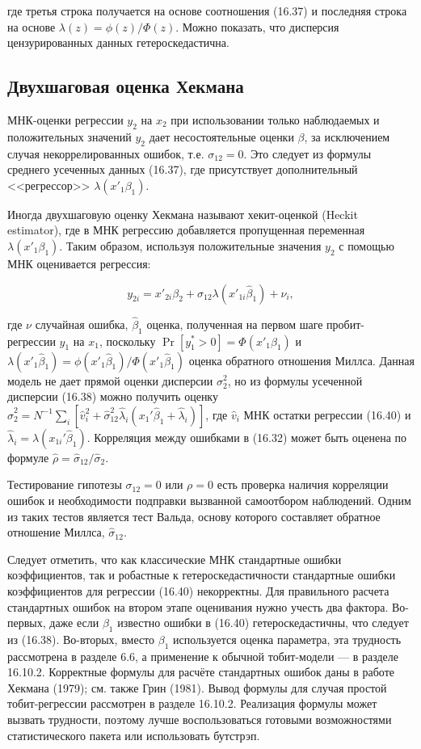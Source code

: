 где третья строка получается на основе соотношения (16.37) и последняя строка на основе $\lambda(z)=\phi(z)/{\Phi}(z)$. Можно показать, что дисперсия цензурированных данных гетероскедастична.


\subsection{Двухшаговая оценка Хекмана}

МНК-оценки регрессии $y_2$ на $x_2$ при использовании только наблюдаемых и положительных значений $y_2$ дает несостоятельные оценки $\beta$, за исключением случая некоррелированных ошибок, т.е. $\sigma_{12}=0$. Это следует из формулы среднего усеченных данных (16.37), где  присутствует дополнительный <<регрессор>> $\lambda(x'_1\beta_1)$. 

Иногда двухшаговую оценку Хекмана называют хекит-оценкой (Heckit estimator), где в МНК регрессию добавляется пропущенная переменная $\lambda(x'_1\beta_1)$. Таким образом, используя положительные значения $y_2$ с помощью МНК оценивается  регрессия:

\begin{equation}
y_{2i}=x'_{2i}\beta_2+\sigma_{12}\lambda(x'_{1i}\hat{\beta}_1)+\nu_i,
\end{equation}

где $\nu$ случайная ошибка, $\hat{\beta}_1$ оценка, полученная на первом шаге пробит- регрессии $y_1$ на $x_1$, поскольку $\Pr[ y^* _1>0]=\Phi({x'}_1\beta_1)$ и $\lambda(x'_1\hat{\beta}_1)=\phi(x'_1\hat{\beta}_1)/{\Phi}(x'_1\hat{\beta}_1)$ оценка обратного отношения Миллса. Данная модель не дает прямой оценки дисперсии $\sigma^2_2$, но из формулы усеченной дисперсии (16.38) можно получить оценку $\hat{\sigma}_2^2=N^{-1}\sum_i[\hat{v}_i^2+\hat{\sigma}_{12}^2\hat{\lambda}_i(x_1'\hat{\beta}_1+\hat{\lambda}_i)]$, где $\hat{v}_i$ МНК остатки  регрессии (16.40) и $\hat{\lambda}_i=\lambda(x_{1i}'\hat{\beta}_1)$. Корреляция между ошибками в (16.32) может быть оценена по формуле $\hat{\rho}=\hat{\sigma}_{12}/\hat{\sigma}_2.$

Тестирование гипотезы $\sigma_{12}=0$ или $\rho=0$ есть проверка наличия корреляции ошибок и необходимости подправки вызванной самоотбором наблюдений. Одним из таких тестов является тест Вальда, основу которого составляет обратное отношение Миллса, $\hat{\sigma}_{12}$. 

Следует отметить, что как классические МНК стандартные ошибки коэффициентов, так и робастные к гетероскедастичности стандартные ошибки коэффициентов для регрессии (16.40) некорректны. Для правильного расчета стандартных ошибок на втором этапе оценивания нужно учесть два фактора. Во-первых, даже если $\beta_1$ известно ошибки в (16.40) гетероскедастичны, что следует из (16.38). Во-вторых, вместо $\beta_1$ используется оценка параметра, эта трудность рассмотрена в разделе 6.6, а применение к обычной тобит-модели --- в разделе 16.10.2. Корректные формулы для расчёте стандартных ошибок даны в работе Хекмана (1979); см. также Грин (1981). Вывод формулы для случая простой тобит-регрессии рассмотрен в разделе 16.10.2. Реализация формулы может вызвать трудности, поэтому лучше воспользоваться готовыми возможностями статистического пакета или использовать бутстрэп.

